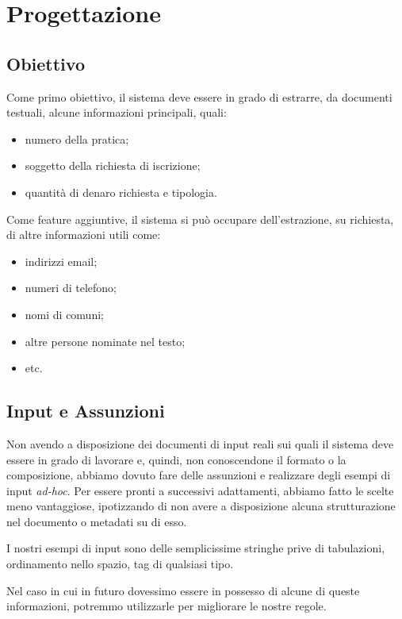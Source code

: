 \section{Progettazione}

\label{sec:Progettazione}

\subsection{Obiettivo}
Come primo obiettivo, il sistema deve essere in grado di estrarre, da documenti testuali, alcune informazioni principali, quali:
\begin{itemize}
\item numero della pratica;
\item soggetto della richiesta di iscrizione;
\item quantità di denaro richiesta e tipologia.
\end{itemize}

Come feature aggiuntive, il sistema si può occupare dell'estrazione, su richiesta, di altre informazioni utili come:
\begin{itemize}
\item indirizzi email;
\item numeri di telefono;
\item nomi di comuni;
\item altre persone nominate nel testo;
\item etc.
\end{itemize}

\subsection{Input e Assunzioni}
Non avendo a disposizione dei documenti di input reali sui quali il sistema deve essere in grado di lavorare e, quindi, non conoscendone il formato o la composizione, abbiamo dovuto fare delle assunzioni e realizzare degli esempi di input \emph{ad-hoc}.
Per essere pronti a successivi adattamenti, abbiamo fatto le scelte meno vantaggiose, ipotizzando di non avere a disposizione alcuna strutturazione nel documento o metadati su di esso.

I nostri esempi di input sono delle semplicissime stringhe prive di tabulazioni, ordinamento nello spazio, tag di qualsiasi tipo.

Nel caso in cui in futuro dovessimo essere in possesso di alcune di queste informazioni, potremmo utilizzarle per migliorare le nostre regole.



